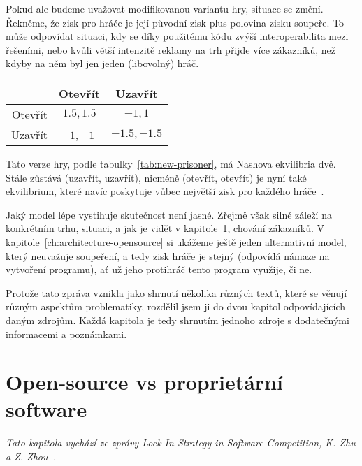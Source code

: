 \begin{multicols}{2}
Pokud ale budeme uvažovat modifikovanou variantu hry, situace se změní. Řekněme, že zisk pro hráče je její původní zisk plus polovina zisku soupeře. To může odpovídat situaci, kdy se díky použitému kódu zvýší interoperabilita mezi řešeními, nebo kvůli větší intenzitě reklamy na trh přijde více zákazníků, než kdyby na něm byl jen jeden (libovolný) hráč.

\begin{Figure}
\begin{center}
\begin{tabular}{r| c c}
		& Otevřít & Uzavřít \\
		\hline
	Otevřít &\cellcolor{gray!25}  $1.5,1.5$ & $-1,1$ \\
	Uzavřít & $1,-1$ &\cellcolor{gray!25}  $-1.5,-1.5$ \\
\end{tabular}
\end{center}
\label{tab:new-prisoner}
\end{Figure}

Tato verze hry, podle tabulky~\ref{tab:new-prisoner}, má Nashova ekvilibria dvě. Stále zůstává (uzavřít, uzavřít), nicméně (otevřít, otevřít) je nyní také ekvilibrium, které navíc poskytuje vůbec největší zisk pro každého hráče~\cite{network-effects-opensource}.

Jaký model lépe vystihuje skutečnost není jasné. Zřejmě však silně záleží na konkrétním trhu, situaci, a jak je vidět v kapitole~\ref{ch:opensource-vs-proprietary}, chování zákazníků. V kapitole~\ref{ch:architecture-opensource} si ukážeme ještě jeden alternativní model, který neuvažuje soupeření, a tedy zisk hráče je stejný (odpovídá námaze na vytvoření programu), ať už jeho protihráč tento program využije, či ne.

Protože tato zpráva vznikla jako shrnutí několika různých textů, které se věnují různým aspektům problematiky, rozdělil jsem ji do dvou kapitol odpovídajících daným zdrojům. Každá kapitola je tedy shrnutím jednoho zdroje s dodatečnými informacemi a poznámkami.




\section{Open-source vs proprietární software}
\label{ch:opensource-vs-proprietary}
	{\em Tato kapitola vychází ze zprávy Lock-In Strategy in Software Competition, K. Zhu a Z. Zhou~\cite{lock-in-competition}.}


\end{multicols}
